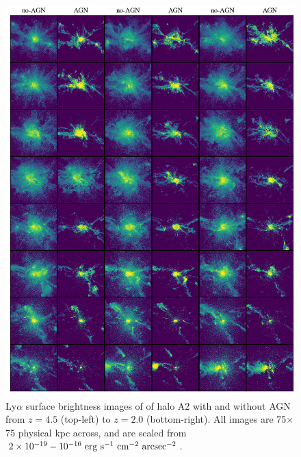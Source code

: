 \begin{figure}
    \centering
    \includegraphics[width=\textwidth,keepaspectratio]{figures/agn_rogues_A2.png}
    \caption{
        Ly$\alpha$ surface brightness images of of halo A2 with and without AGN from $z=4.5$ (top-left) to $z=2.0$ (bottom-right).
        All images are 75$\times$75 physical kpc across, and are scaled from $2\times 10^{-19}-10^{-16}\ \rm{erg}\ \rm{s}^{-1}\ \rm{cm}^{-2}\ \rm{arcsec}^{-2}$.
    }
  \label{fig:agn_rogues2}
\end{figure}

